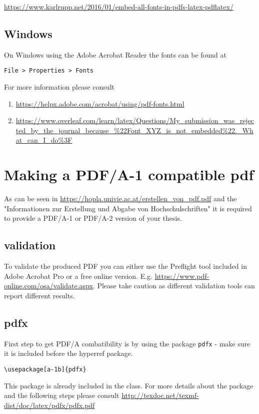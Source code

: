 \documentclass{article}
\begin{document}
\url{https://www.karlrupp.net/2016/01/embed-all-fonts-in-pdfs-latex-pdflatex/}
\subsection{Windows}
On Windows using the Adobe Acrobat Reader the fonts can be found at
\begin{verbatim}
File > Properties > Fonts
\end{verbatim}
For more information please consult
\begin{enumerate}
\item \url{https://helpx.adobe.com/acrobat/using/pdf-fonts.html}

\item \url{https://www.overleaf.com/learn/latex/Questions/My_submission_was_rejected_by_the_journal_because_%22Font_XYZ_is_not_embedded%22._What_can_I_do%3F} 
\end{enumerate}

\section{Making a PDF/A-1 compatible pdf}
As can be seen in \url{https://hopla.univie.ac.at/erstellen_von_pdf.pdf} and the "Informationen zur Erstellung und Abgabe von Hochschulschriften" it is required to provide a PDF/A-1 or PDF/A-2 version of your thesis.

\subsection{validation}
To validate the produced PDF you can either use the Preflight tool included in Adobe Acrobat Pro or a free online version. E.g. \url{https://www.pdf-online.com/osa/validate.aspx}.
Please take caution as different validation tools can report different results.

\subsection{pdfx}
First step to get PDF/A combatibility is by using the package \verb|pdfx| - make sure it is included before the hyperref package.
\begin{verbatim}
\usepackage[a-1b]{pdfx}
\end{verbatim}
This package is already included in the class.
For more details about the package and the following steps please consult \url{http://texdoc.net/texmf-dist/doc/latex/pdfx/pdfx.pdf}
\end{document}
